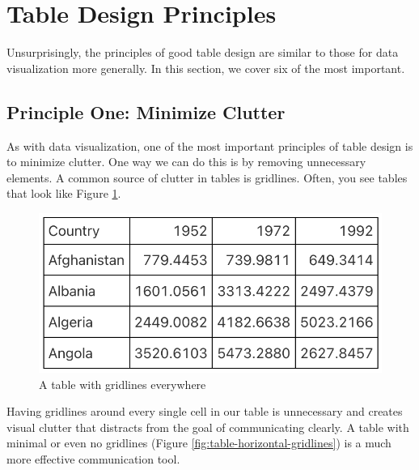 \documentclass[
]{book}
\begin{document}
\hypertarget{table-design-principles}{%
\section*{Table Design Principles}\label{table-design-principles}}

Unsurprisingly, the principles of good table design are similar to those for data visualization more generally. In this section, we cover six of the most important.

\hypertarget{principle-one-minimize-clutter}{%
\subsection*{Principle One: Minimize Clutter}\label{principle-one-minimize-clutter}}

As with data visualization, one of the most important principles of table design is to minimize clutter. One way we can do this is by removing unnecessary elements. A common source of clutter in tables is gridlines. Often, you see tables that look like Figure \ref{fig:table-with-gridlines}.

\begin{figure}
\includegraphics[width=1\linewidth]{nostarch/temp/F05001} \caption{A table with gridlines everywhere}\label{fig:table-with-gridlines}
\end{figure}

Having gridlines around every single cell in our table is unnecessary and creates visual clutter that distracts from the goal of communicating clearly. A table with minimal or even no gridlines (Figure \ref{fig:table-horizontal-gridlines}) is a much more effective communication tool.
\end{document}
